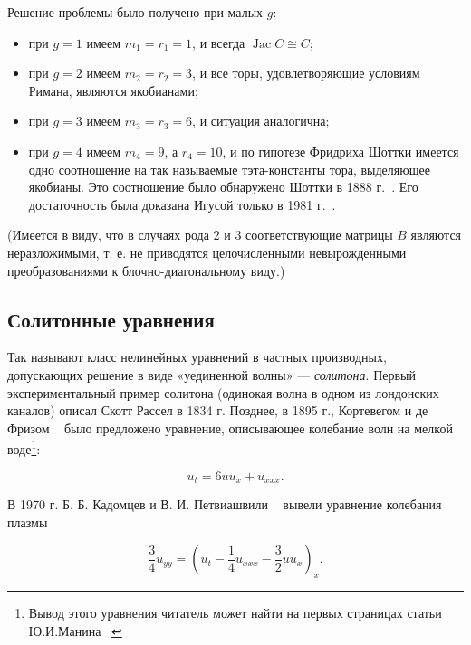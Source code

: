 \documentclass{article}
\theoremstyle{definition}
\theoremstyle{definition} %
\theoremstyle{remark}     %
\theoremstyle{definition}
\theoremstyle{definition}
\theoremstyle{definition}
\theoremstyle{definition}
\theoremstyle{definition}
\theoremstyle{definition}
\theoremstyle{definition}
\theoremstyle{definition}
\begin{document}
Решение проблемы было получено при малых \(g\):
\begin{itemize}
    \item при \(g = 1\) имеем \(m_1 = r_1 = 1\), и всегда \(\operatorname{Jac} C \cong C\);
    \item при \(g = 2\) имеем \(m_2 = r_2 = 3\), и все торы, удовлетворяющие условиям Римана, являются якобианами;
    \item при \( g = 3 \) имеем \( m_3 = r_3 = 6 \), и ситуация аналогична;
    \item при \( g = 4 \) имеем \( m_4 = 9 \), а \( r_4 = 10 \), и по гипотезе Фридриха Шоттки имеется одно соотношение на так называемые тэта-константы тора, выделяющее якобианы. Это соотношение было обнаружено Шоттки в 1888 г.~\cite{schottky}. Его достаточность была доказана Игусой только в 1981 г.~\cite{igusa}.

\end{itemize}

(Имеется в виду, что в случаях рода 2 и 3 соответствующие матрицы \( B \) являются неразложимыми, т. е. не приводятся целочисленными невырожденными преобразованиями к блочно-диагональному виду.)











\subsection{Солитонные уравнения}

Так называют класс нелинейных уравнений в частных производных, допускающих решение в виде «уединенной волны» --- \emph{солитона}. Первый экспериментальный пример солитона (одинокая волна в одном из лондонских каналов) описал Скотт Рассел в 1834 г. Позднее, в 1895 г., Кортевегом и де Фризом ~\cite{korteweg-deVries} было предложено уравнение, описывающее колебание волн на мелкой воде\footnote{Вывод этого уравнения читатель может найти на первых страницах статьи Ю.И.Манина ~\cite{manin}}:

\begin{equation*}\label{eq:KdF}
u_t = 6uu_x + u_{xxx}. \tag{КдФ}
\end{equation*}


В 1970 г. Б. Б. Кадомцев и В. И. Петвиашвили ~\cite{kadomtsev-petviashvili} вывели уравнение колебания плазмы

\begin{equation*}\label{eq:KP}
\frac{3}{4}u_{yy} = \left(u_t - \frac{1}{4}u_{xxx} - \frac{3}{2}uu_x\right)_x. \tag{КП}
\end{equation*}
\end{document}

